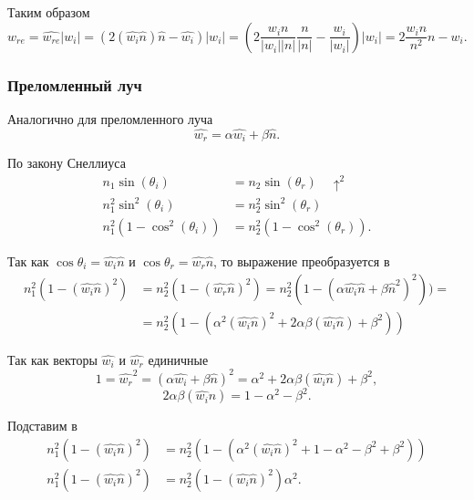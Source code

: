 Таким образом
\begin{equation}
    w_{re} = \widehat{w_{re}} |w_i|
           = (2 (\widehat{w_i} \widehat{n}) \widehat{n} - \widehat{w_i}) |w_i|
           = (2 \frac{w_i n}{|w_i| |n|} \frac{n}{|n|} - \frac{w_i}{|w_i|}) |w_i|
           = 2 \frac{w_i n}{n^2} n - w_i.
\end{equation}

\subsubsection*{Преломленный луч}
Аналогично для преломленного луча
\[ \widehat{w_r} = \alpha \widehat{w_i} + \beta \widehat{n}. \]

По закону Снеллиуса
\begin{align} \label{math:snell}
    n_1 \sin(\theta_i) & = n_2 \sin(\theta_r) \quad \uparrow^2 \nonumber \\
    n_1^2 \sin^2(\theta_i) & = n_2^2 \sin^2(\theta_r) \nonumber \\
    n_1^2 (1 - \cos^2(\theta_i)) & = n_2^2 (1 - \cos^2(\theta_r)).
\end{align}

Так как $\cos{\theta_i} = \widehat{w_i} \widehat{n}$ и
$\cos{\theta_r} = \widehat{w_r} \widehat{n}$, то выражение 
преобразуется в
\begin{align} \label{math:snell2}
    n_1^2 (1 - (\widehat{w_i} \widehat{n})^2) & = n_2^2 (1 - (\widehat{w_r} \widehat{n})^2)
                                                = n_2^2 (1 - (\alpha \widehat{w_i} \widehat{n} + \beta \widehat{n}^2)^2)) = \nonumber \\
                                              & = n_2^2 (1 - (\alpha^2 (\widehat{w_i} \widehat{n})^2
                                                         + 2 \alpha \beta (\widehat{w_i} \widehat{n}) + \beta^2))
\end{align}

Так как векторы $\widehat{w_i}$ и $\widehat{w_r}$ единичные
\begin{equation} \label{math:w_r2}
    1 = \widehat{w_r}^2 = (\alpha \widehat{w_i} + \beta \widehat{n})^2
      = \alpha^2 + 2 \alpha \beta (\widehat{w_i} \widehat{n}) + \beta^2,
\end{equation}
\begin{equation} \label{math:2ab}
    2 \alpha \beta (\widehat{w_i} \widehat{n}) = 1 - \alpha^2 - \beta^2.
\end{equation}

Подставим  в 
\begin{align*}
    n_1^2 (1 - (\widehat{w_i} \widehat{n})^2) & = n_2^2 (1 - (\alpha^2 (\widehat{w_i} \widehat{n})^2
                                                              + 1 - \alpha^2 - \beta^2 + \beta^2)) \\
    n_1^2 (1 - (\widehat{w_i} \widehat{n})^2) & = n_2^2 (1 - (\widehat{w_i} \widehat{n})^2) \alpha^2.
\end{align*}

